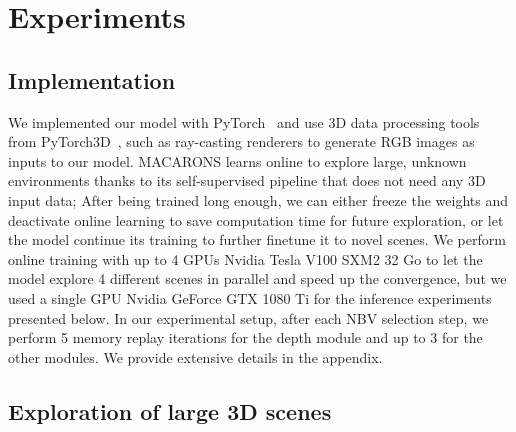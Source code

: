 \section{Experiments}
\label{sec:experiments}

\subsection{Implementation}


We implemented our model with PyTorch~\cite{paszke-nips19-pytorch} and use 3D data processing tools from PyTorch3D~\cite{ravi-arxiv20-accelerating3ddeeplearning}, such as ray-casting renderers to generate RGB images as inputs to our model.
%
MACARONS learns online to explore large, unknown environments thanks to its self-supervised pipeline that does not need any 3D input data; After being trained long enough, we can either freeze the weights and deactivate online learning to save computation time for future exploration, or let the model continue its training to further finetune it to novel scenes.
%
We perform online training with up to 4 GPUs Nvidia Tesla V100 SXM2 32 Go to let the model explore 4 different scenes in parallel and speed up the convergence, but we used a single GPU Nvidia GeForce GTX 1080 Ti for the inference experiments presented below.
%
In our experimental setup, after each NBV selection step, we perform 5 memory replay iterations for the depth module and up to 3 for the other modules. We provide extensive details in the appendix.

\subsection{Exploration of large 3D scenes}

